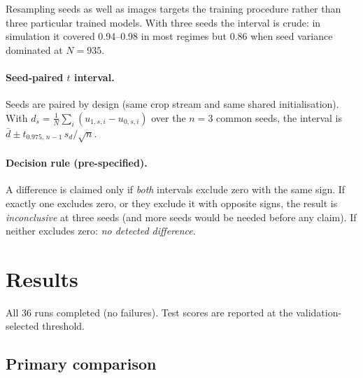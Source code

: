 \documentclass[11pt]{article}
\begin{document}
Resampling seeds as well as images targets the training procedure rather than three particular
trained models. With three seeds the interval is crude: in simulation it covered 0.94--0.98 in most
regimes but 0.86 when seed variance dominated at $N=935$.

\paragraph{Seed-paired $t$ interval.} Seeds are paired by design (same crop stream and same
shared initialisation). With $d_s = \frac1N\sum_i (u_{1,s,i}-u_{0,s,i})$ over the $n=3$ common seeds,
the interval is $\bar d \pm t_{0.975,\,n-1}\, s_d/\sqrt n$.

\paragraph{Decision rule (pre-specified).} A difference is claimed only if \emph{both} intervals
exclude zero with the same sign. If exactly one excludes zero, or they exclude it with opposite
signs, the result is \emph{inconclusive} at three seeds (and more seeds would be needed before any
claim). If neither excludes zero: \emph{no detected difference}.

\section{Results}
\label{sec:results}

All 36 runs completed (no failures). Test scores are reported at the validation-selected threshold.

\subsection{Primary comparison}

\begin{table}[h]
\centering
\caption{Primary analysis: R1 (DWT at the input) versus R0 (stock), per-image test IoU, 3 seeds per arm.}
\label{tab:primary}
\end{table}
\end{document}
